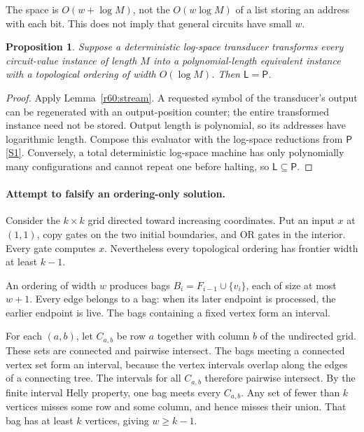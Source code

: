 \documentclass[11pt,a4paper]{article}
\newcommand{\sref}[2]{\hyperlink{source:#1:#2}{[S#2]}}
\newtheorem{notebookproposition}[notebooklemma]{Proposition}
\numberwithin{equation}{section}
\begin{document}
The space is $O(w+\log M)$, not the $O(w\log M)$ of a list storing an address with each bit. This does not imply that general circuits have small $w$.

\begin{notebookproposition}\label{r60:conditional}
Suppose a deterministic log-space transducer transforms every circuit-value instance of length $M$ into a polynomial-length equivalent instance with a topological ordering of width $O(\log M)$. Then $\mathsf L=\mathsf P$.
\end{notebookproposition}
\begin{proof}
Apply Lemma~\ref{r60:stream}. A requested symbol of the transducer's output can be regenerated with an output-position counter; the entire transformed instance need not be stored. Output length is polynomial, so its addresses have logarithmic length. Compose this evaluator with the log-space reductions from $\mathsf P$ \sref{60}{1}. Conversely, a total deterministic log-space machine has only polynomially many configurations and cannot repeat one before halting, so $\mathsf L\subseteq\mathsf P$.
\end{proof}

\paragraph{Attempt to falsify an ordering-only solution.}
Consider the $k\times k$ grid directed toward increasing coordinates. Put an input $x$ at $(1,1)$, copy gates on the two initial boundaries, and OR gates in the interior. Every gate computes $x$. Nevertheless every topological ordering has frontier width at least $k-1$.

An ordering of width $w$ produces bags $B_i=F_{i-1}\cup\{v_i\}$, each of size at most $w+1$. Every edge belongs to a bag: when its later endpoint is processed, the earlier endpoint is live. The bags containing a fixed vertex form an interval.

For each $(a,b)$, let $C_{a,b}$ be row $a$ together with column $b$ of the undirected grid. These sets are connected and pairwise intersect. The bags meeting a connected vertex set form an interval, because the vertex intervals overlap along the edges of a connecting tree. The intervals for all $C_{a,b}$ therefore pairwise intersect. By the finite interval Helly property, one bag meets every $C_{a,b}$. Any set of fewer than $k$ vertices misses some row and some column, and hence misses their union. That bag has at least $k$ vertices, giving $w\ge k-1$.
\end{document}
